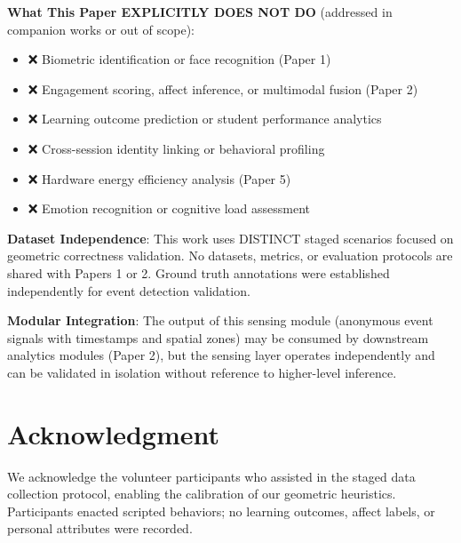 \documentclass[conference]{IEEEtran}
\begin{document}
\textbf{What This Paper EXPLICITLY DOES NOT DO} (addressed in companion works or out of scope):
\begin{itemize}
    \item ❌ Biometric identification or face recognition (Paper 1)
    \item ❌ Engagement scoring, affect inference, or multimodal fusion (Paper 2)
    \item ❌ Learning outcome prediction or student performance analytics
    \item ❌ Cross-session identity linking or behavioral profiling
    \item ❌ Hardware energy efficiency analysis (Paper 5)
    \item ❌ Emotion recognition or cognitive load assessment
\end{itemize}

\textbf{Dataset Independence}: This work uses DISTINCT staged scenarios focused on geometric correctness validation. No datasets, metrics, or evaluation protocols are shared with Papers 1 or 2. Ground truth annotations were established independently for event detection validation.

\textbf{Modular Integration}: The output of this sensing module (anonymous event signals with timestamps and spatial zones) may be consumed by downstream analytics modules (Paper 2), but the sensing layer operates independently and can be validated in isolation without reference to higher-level inference.

\section*{Acknowledgment}
We acknowledge the volunteer participants who assisted in the staged data collection protocol, enabling the calibration of our geometric heuristics. Participants enacted scripted behaviors; no learning outcomes, affect labels, or personal attributes were recorded.
\end{document}
